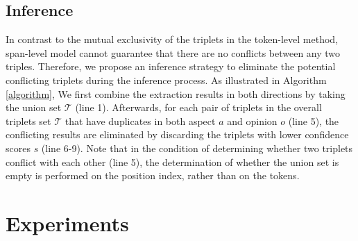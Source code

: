 \documentclass[11pt]{article}
\begin{document}
\subsection{Inference} \label{infer}
In contrast to the mutual exclusivity of the triplets in the token-level method, span-level model cannot guarantee that there are no conflicts between any two triples. Therefore, we propose an inference strategy to eliminate the potential conflicting triplets during the inference process. As illustrated in Algorithm \ref{algorithm}, We first combine the extraction results in both directions by taking the union set $\mathcal{T}$ (line 1). Afterwards, for each pair of triplets in the overall triplets set $\mathcal{T}$ that have duplicates in both aspect $a$ and opinion $o$ (line 5), the conflicting results are eliminated by discarding the triplets with lower confidence scores $s$ (line 6-9). Note that in the condition of determining whether two triplets conflict with each other (line 5), the determination of whether the union set is empty is performed on the position index, rather than on the tokens.

\section{Experiments}
\end{document}

